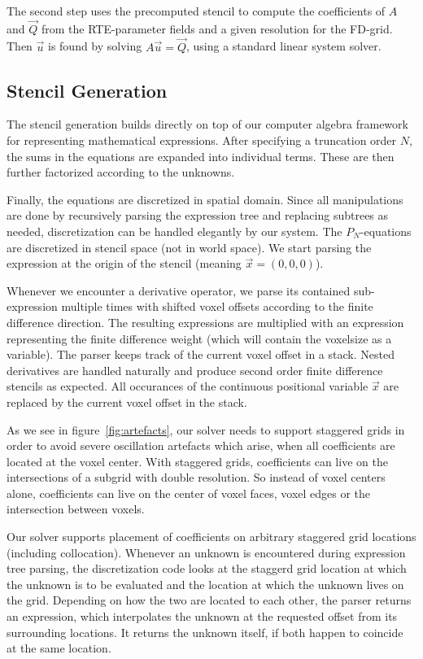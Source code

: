 The second step uses the precomputed stencil to compute the coefficients of $A$ and $\vec{Q}$ from the RTE-parameter fields and a given resolution for the FD-grid. Then $\vec{u}$ is found by solving $A\vec{u}=\vec{Q}$, using a standard linear system solver.


\subsection{Stencil Generation}

The stencil generation builds directly on top of our computer algebra framework for representing mathematical expressions. After specifying a truncation order $N$, the sums in the equations are expanded into individual terms. These are then further factorized according to the unknowns. 

Finally, the equations are discretized in spatial domain. Since all manipulations are done by recursively parsing the expression tree and replacing subtrees as needed, discretization can be handled elegantly by our system. The $P_N$-equations are discretized in stencil space (not in world space). We start parsing the expression at the origin of the stencil (meaning $\vec{x}=(0,0,0)$). 

Whenever we encounter a derivative operator, we parse its contained sub-expression multiple times with shifted voxel offsets according to the finite difference direction. The resulting expressions are multiplied with an expression representing the finite difference weight (which will contain the voxelsize as a variable). The parser keeps track of the current voxel offset in a stack. Nested derivatives are handled naturally and produce second order finite difference stencils as expected. All occurances of the continuous positional variable $\vec{x}$ are replaced by the current voxel offset in the stack. 

As we see in figure~\ref{fig:artefacts}, our solver needs to support staggered grids in order to avoid severe oscillation artefacts which arise, when all coefficients are located at the voxel center. With staggered grids, coefficients can live on the intersections of a subgrid with double resolution. So instead of voxel centers alone, coefficients can live on the center of voxel faces, voxel edges or the intersection between voxels.

Our solver supports placement of coefficients on arbitrary staggered grid locations (including collocation). Whenever an unknown is encountered during expression tree parsing, the discretization code looks at the staggerd grid location at which the unknown is to be evaluated and the location at which the unknown lives on the grid. Depending on how the two are located to each other, the parser returns an expression, which interpolates the unknown at the requested offset from its surrounding locations. It returns the unknown itself, if both happen to coincide at the same location.

